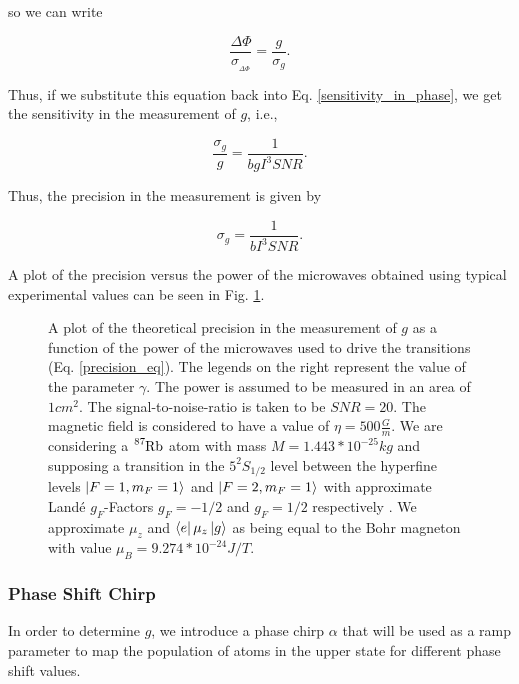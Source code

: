 \documentclass{article}
\begin{document}
so we can write 

\begin{equation}
    \frac{\Delta \Phi}{\sigma_{_{\Delta \Phi}}} = \frac{g}{\sigma_{g}}.
\end{equation}

Thus, if we substitute this equation back into Eq. \ref{sensitivity_in_phase}, we get the sensitivity in the measurement of $g$, i.e.,

\begin{equation}\label{sensitivity_eq}
    \frac{\sigma_{g}}{g} = \frac{1}{b g I^3 SNR}.
\end{equation}

Thus, the precision in the measurement is given by

\begin{equation}\label{precision_eq}
    \sigma_{g} = \frac{1}{b I^3 SNR}.
\end{equation}

A plot of the precision versus the power of the microwaves obtained using typical experimental values can be seen in Fig. \ref{precision_vs_power_figure}.

\begin{figure}
    \centering
    
    \caption{A plot of the theoretical precision in the measurement of $g$ as a function of the power of the microwaves used to drive the transitions (Eq. \ref{precision_eq}). The legends on the right represent the value of the parameter $\gamma$. The power is assumed to be measured in an area of $1cm^2$. The signal-to-noise-ratio is taken to be $SNR=20$. The magnetic field is considered to have a value of $\eta = 500 \frac{G}{m}$. We are considering a $\ce{^{87}_{}Rb}$ atom with mass $M=1.443*10^{-25}kg$ and supposing a transition in the $5^{2}S_{1/2}$ level between the hyperfine levels $\ket{F=1, m_{F}=1}$ and $\ket{F=2, m_{F}=1}$ with approximate Landé $g_{F}$-Factors $g_{F}=-1/2$ and $g_{F}=1/2$ respectively \cite{Steck2010}. We approximate $\mu_{z}$ and $\bra{e} \mu_{z} \ket{g}$ as being equal to the Bohr magneton with value $\mu_{B}=9.274*10^{-24}J/T$.}
    \label{precision_vs_power_figure}
\end{figure}

\subsubsection{Phase Shift Chirp}
In order to determine $g$, we introduce a phase chirp $\alpha$ that will be used as a ramp parameter to map the population of atoms in the upper state for different phase shift values. 
\end{document}
